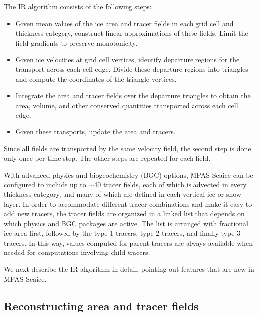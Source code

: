 The IR algorithm consists of the following steps:
\begin{itemize}
\item Given mean values of the ice area and tracer fields in each grid cell and thickness category, construct linear approximations of these fields. Limit the field gradients to preserve monotonicity.
\item Given ice velocities at grid cell vertices, identify departure regions for the transport across each cell edge. Divide these departure regions into triangles and compute the coordinates of the triangle vertices.
\item Integrate the area and tracer fields over the departure triangles to obtain the area, volume, and other conserved quantities transported across each cell edge.
\item Given these transports, update the area and tracers.
\end{itemize}
\noindent
Since all fields are transported by the same velocity field, the second step is done only once per time step. The other steps are repeated for each field.

With advanced physics and biogeochemistry (BGC) options, MPAS-Seaice can be configured to include up to $\sim$40 tracer fields, each of which is advected in every thickness category, and many of which are defined in each vertical ice or snow layer. In order to accommodate different tracer combinations and make it easy to add new tracers, the tracer fields are organized in a linked list that depends on which physics and BGC packages are active. The list is arranged with fractional ice area first, followed by the type 1 tracers, type 2 tracers, and finally type 3 tracers. In this way, values computed for parent tracers are always available when needed for computations involving child tracers.

We next describe the IR algorithm in detail, pointing out features that are new in MPAS-Seaice.

\subsection{Reconstructing area and tracer fields}
\label{IR_reconstruct}

